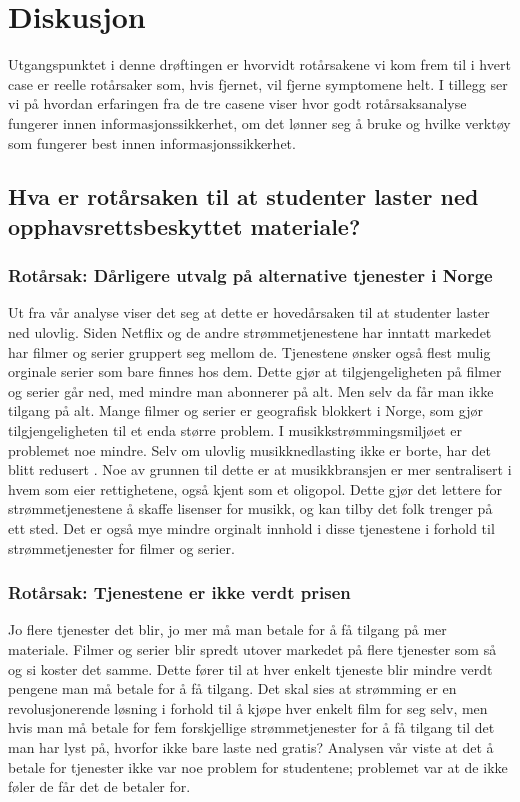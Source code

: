 \chapter{Diskusjon}
\label{kap:diskusjon}
Utgangspunktet i denne drøftingen er hvorvidt rotårsakene vi kom frem til i hvert case er reelle rotårsaker som, hvis fjernet, vil fjerne symptomene helt. I tillegg ser vi på hvordan erfaringen fra de tre casene viser hvor godt rotårsaksanalyse fungerer innen informasjonssikkerhet, om det lønner seg å bruke og hvilke verktøy som fungerer best innen informasjonssikkerhet. 

\section{Hva er rotårsaken til at studenter laster ned opphavsrettsbeskyttet materiale?}
\subsection*{Rotårsak: Dårligere utvalg på alternative tjenester i Norge}
Ut fra vår analyse viser det seg at dette er hovedårsaken til at studenter laster ned ulovlig. Siden Netflix og de andre strømmetjenestene har inntatt markedet har filmer og serier gruppert seg mellom de. Tjenestene ønsker også flest mulig orginale serier som bare finnes hos dem. Dette gjør at tilgjengeligheten på filmer og serier går ned, med mindre man abonnerer på alt. Men selv da får man ikke tilgang på alt. Mange filmer og serier er geografisk blokkert i Norge, som gjør tilgjengeligheten til et enda større problem. I musikkstrømmingsmiljøet er problemet noe mindre. Selv om ulovlig musikknedlasting ikke er borte, har det blitt redusert \cite{musikkstream}. Noe av grunnen til dette er at musikkbransjen er mer sentralisert i hvem som eier rettighetene, også kjent som et oligopol. Dette gjør det lettere for strømmetjenestene å skaffe lisenser for musikk, og kan tilby det folk trenger på ett sted. Det er også mye mindre orginalt innhold i disse tjenestene i forhold til strømmetjenester for filmer og serier. 

\subsection*{Rotårsak: Tjenestene er ikke verdt prisen}
Jo flere tjenester det blir, jo mer må man betale for å få tilgang på mer materiale. Filmer og serier blir spredt utover markedet på flere tjenester som så og si koster det samme. Dette fører til at hver enkelt tjeneste blir mindre verdt pengene man må betale for å få tilgang. Det skal sies at strømming er en revolusjonerende løsning i forhold til å kjøpe hver enkelt film for seg selv, men hvis man må betale for fem forskjellige strømmetjenester for å få tilgang til det man har lyst på, hvorfor ikke bare laste ned gratis? Analysen vår viste at det å betale for tjenester ikke var noe problem for studentene; problemet var at de ikke føler de får det de betaler for. 

